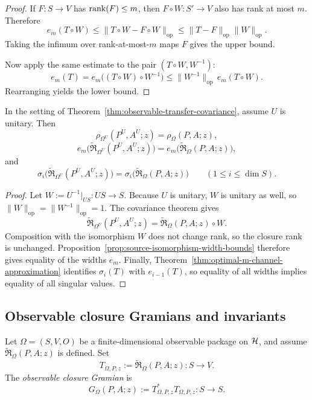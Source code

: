 \begin{proof}
If \(F:S\to V\) has \(\mathrm{rank}(F)\le m\), then \(F\circ W:S'\to V\) also has rank
at most \(m\). Therefore
\[
e_m(T\circ W)
\le
\|T\circ W-F\circ W\|_{\mathrm{op}}
\le
\|T-F\|_{\mathrm{op}}\|W\|_{\mathrm{op}}.
\]
Taking the infimum over rank-at-most-\(m\) maps \(F\) gives the upper bound.

Now apply the same estimate to the pair \((T\circ W,W^{-1})\):
\[
e_m(T)
=
e_m\bigl((T\circ W)\circ W^{-1}\bigr)
\le
\|W^{-1}\|_{\mathrm{op}}\,e_m(T\circ W).
\]
Rearranging yields the lower bound.
\end{proof}

\begin{corollary}
\label{cor:unitary-workload-invariance}
In the setting of Theorem~\ref{thm:observable-transfer-covariance}, assume
\(U\) is unitary. Then
\[
\rho_{\Omega^U}(P^U,A^U;z)=\rho_{\Omega}(P,A;z),
\]
\[
e_m\!\bigl(\widetilde{\mathfrak R}_{\Omega^U}(P^U,A^U;z)\bigr)
=
e_m\!\bigl(\widetilde{\mathfrak R}_{\Omega}(P,A;z)\bigr),
\]
and
\[
\sigma_i\!\bigl(\widetilde{\mathfrak R}_{\Omega^U}(P^U,A^U;z)\bigr)
=
\sigma_i\!\bigl(\widetilde{\mathfrak R}_{\Omega}(P,A;z)\bigr)
\qquad (1\le i\le \dim S).
\]
\end{corollary}

\begin{proof}
Let \(W:=U^{-1}\big|_{US}:US\to S\). Because \(U\) is unitary, \(W\) is
unitary as well, so \(\|W\|_{\mathrm{op}}=\|W^{-1}\|_{\mathrm{op}}=1\). The
covariance theorem gives
\[
\widetilde{\mathfrak R}_{\Omega^U}(P^U,A^U;z)
=
\widetilde{\mathfrak R}_{\Omega}(P,A;z)\circ W.
\]
Composition with the isomorphism \(W\) does not change rank, so the closure
rank is unchanged. Proposition~\ref{prop:source-isomorphism-width-bounds}
therefore gives equality of the widths \(e_m\). Finally,
Theorem~\ref{thm:optimal-m-channel-approximation} identifies
\(\sigma_i(T)\) with \(e_{i-1}(T)\), so equality of all widths implies
equality of all singular values.
\end{proof}

\subsection{Observable closure Gramians and invariants}

\begin{definition}
\label{def:observable-closure-gramian}
Let \(\Omega=(S,V,O)\) be a finite-dimensional observable package on \(\mathcal{H}\),
and assume \(\widetilde{\mathfrak R}_{\Omega}(P,A;z)\) is defined. Set
\[
T_{\Omega,P,z}
:=
\widetilde{\mathfrak R}_{\Omega}(P,A;z):S\to V.
\]
The \emph{observable closure Gramian} is
\[
G_{\Omega}(P,A;z):=T_{\Omega,P,z}^\ast T_{\Omega,P,z}:S\to S.
\]
\end{definition}

